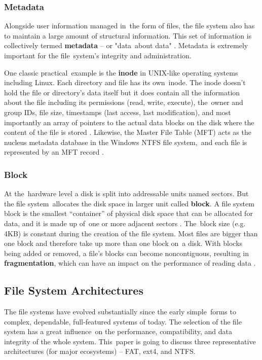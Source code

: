 \documentclass[12pt]{article}
\begin{document}
\subsubsection{Metadata}
Alongside user information managed in the form of files, the file system also has to maintain a large amount of structural information. This set of information is collectively termed \textbf{metadata} – or "data about data" \parencite{EMC2012InformationStorage}. Metadata is extremely important for the file system's integrity and administration.

One classic practical example is the \textbf{inode} in UNIX-like operating systems including Linux. Each directory and file has its own inode. The inode doesn't hold the file or directory's data itself but it does contain all the information about the file including its permissions (read, write, execute), the owner and group IDs, file size, timestamps (last access, last modification), and most importantly an array of pointers to the actual data blocks on the disk where the content of the file is stored \parencite{LinuxJournalInode}. Likewise, the Master File Table (MFT) acts as the nucleus metadata database in the Windows NTFS file system, and each file is represented by an MFT record \parencite{Silberschatz2018}. 

\subsubsection{Block}
At the hardware level a disk is split into addressable units named sectors. But the file system allocates the disk space in larger unit called \textbf{block}. A file system block is the smallest “container” of physical disk space that can be allocated for data, and it is made up of one or more adjacent sectors \parencite{EMC2012InformationStorage}. The block size (e.g. 4KB) is constant during the creation of the file system. Most files are bigger than one block and therefore take up more than one block on a disk. With blocks being added or removed, a file's blocks can become noncontiguous, resulting in \textbf{fragmentation}, which can have an impact on the performance of reading data \parencite{Tanenbaum2014}.



\subsection{File System Architectures}
The file systems have evolved substantially since the early simple forms to complex, dependable, full-featured systems of today. The selection of the file system has a great influence on the performance, compatibility, and data integrity of the whole system. This paper is going to discuss three representative architectures (for major ecosystems) – FAT, ext4, and NTFS. 
\end{document}

